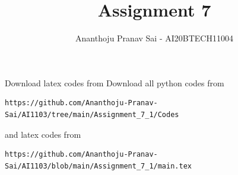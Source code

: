\documentclass[journal,12pt,twocolumn]{IEEEtran}
\DeclareMathOperator*{\Res}{Res}
\begin{document}
\newcommand{\BEQA}{\begin{eqnarray}}
\newcommand{\EEQA}{\end{eqnarray}}
\newcommand{\define}{\stackrel{\triangle}{=}}

\raggedbottom
\setlength{\parindent}{0pt}
\providecommand{\mbf}{\mathbf}
\providecommand{\pr}[1]{\ensuremath{\Pr\left(#1\right)}}
\providecommand{\qfunc}[1]{\ensuremath{Q\left(#1\right)}}
\providecommand{\sbrak}[1]{\ensuremath{{}\left[#1\right]}}
\providecommand{\lsbrak}[1]{\ensuremath{{}\left[#1\right.}}
\providecommand{\rsbrak}[1]{\ensuremath{{}\left.#1\right]}}
\providecommand{\brak}[1]{\ensuremath{\left(#1\right)}}
\providecommand{\lbrak}[1]{\ensuremath{\left(#1\right.}}
\providecommand{\rbrak}[1]{\ensuremath{\left.#1\right)}}
\providecommand{\cbrak}[1]{\ensuremath{\left\{#1\right\}}}
\providecommand{\lcbrak}[1]{\ensuremath{\left\{#1\right.}}
\providecommand{\rcbrak}[1]{\ensuremath{\left.#1\right\}}}
\theoremstyle{remark}
\newtheorem{rem}{Remark}
\newcommand{\sgn}{\mathop{\mathrm{sgn}}}
\providecommand{\abs}[1]{\vert#1\vert}
\providecommand{\res}[1]{\Res\displaylimits_{#1}} 
\providecommand{\norm}[1]{\lVert#1\rVert}
\providecommand{\mtx}[1]{\mathbf{#1}}
\providecommand{\mean}[1]{E[ #1 ]}
\providecommand{\fourier}{\overset{\mathcal{F}}{ \rightleftharpoons}}
\providecommand{\system}{\overset{\mathcal{H}}{ \longleftrightarrow}}
\newcommand{\solution}{\noindent \textbf{Solution: }}
\newcommand{\cosec}{\,\text{cosec}\,}
\providecommand{\dec}[2]{\ensuremath{\overset{#1}{\underset{#2}{\gtrless}}}}
\newcommand{\myvec}[1]{\ensuremath{\begin{pmatrix}#1\end{pmatrix}}}
\newcommand{\mydet}[1]{\ensuremath{\begin{vmatrix}#1\end{vmatrix}}}
\makeatletter
{}
\makeatother
\let\StandardTheFigure\thefigure
\let\vec\mathbf
\renewcommand{\thefigure}{\theproblem}
\def\putbox#1#2#3{\makebox[0in][l]{\makebox[#1][l]{}\raisebox{\baselineskip}[0in][0in]{\raisebox{#2}[0in][0in]{#3}}}}
     \def\rightbox#1{\makebox[0in][r]{#1}}
     \def\centbox#1{\makebox[0in]{#1}}
     \def\topbox#1{\raisebox{-\baselineskip}[0in][0in]{#1}}
     \def\midbox#1{\raisebox{-0.5\baselineskip}[0in][0in]{#1}}
\vspace{3cm}
\title{Assignment 7}
\author{Ananthoju Pranav Sai - AI20BTECH11004}
\maketitle
\newpage
\bigskip
\renewcommand{\thefigure}{\theenumi}
\renewcommand{\thetable}{\theenumi}
Download latex codes from 
%
Download all python codes from 
\begin{lstlisting}
https://github.com/Ananthoju-Pranav-Sai/AI1103/tree/main/Assignment_7_1/Codes
\end{lstlisting}
%
and latex codes from 
%
\begin{lstlisting}
https://github.com/Ananthoju-Pranav-Sai/AI1103/blob/main/Assignment_7_1/main.tex
\end{lstlisting}
\end{document}

